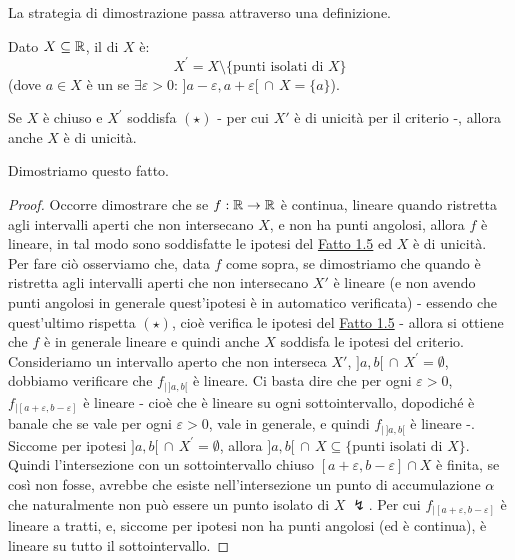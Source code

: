 La strategia di dimostrazione passa attraverso una definizione.

\begin{definition}
Dato $X \subseteq \mathbb R$, il  di $X$ è:
\[ X^{\prime} = X \setminus\{\text{punti isolati di $X$}\}
	\]
(dove $a \in X$ è un  se $\exists \varepsilon > 0 :\, ]a - \varepsilon, a + \varepsilon[ \,\cap\, X = \{a\}$).
\end{definition}

\begin{remark}
Se $X$ è chiuso e $X^{\prime}$ soddisfa $(\star)$ - per cui $X'$ è di unicità per il criterio -, allora anche $X$ è di unicità.
\end{remark}

Dimostriamo questo fatto.

\begin{proof}
Occorre dimostrare che se $f : \mathbb R \to \mathbb R$ è continua, lineare quando ristretta agli intervalli aperti che non intersecano $X$, e non ha punti angolosi, allora $f$ è lineare, in tal modo sono soddisfatte le ipotesi del \hyperref[unicità]{Fatto 1.5} ed $X$ è di unicità.\\
Per fare ciò osserviamo che, data $f$ come sopra, se dimostriamo che quando è ristretta agli intervalli aperti che non intersecano $X'$ è lineare (e non avendo punti angolosi in generale quest'ipotesi è in automatico verificata) - essendo che quest'ultimo rispetta $(\star)$, cioè verifica le ipotesi del \hyperref[unicità]{Fatto 1.5} - allora si ottiene che $f$ è in generale lineare e quindi anche $X$ soddisfa le ipotesi del criterio.\\
Consideriamo un intervallo aperto che non interseca $X'$, $]a,b[ \,\cap\, X^{\prime} = \emptyset$, dobbiamo verificare che $f_{|\,]a,b[}$ è lineare. Ci basta dire che per ogni $\varepsilon > 0$, $f_{|[a+\varepsilon, b-\varepsilon]}$ è lineare - cioè che è lineare su ogni sottointervallo, dopodiché è banale che se vale per ogni $\varepsilon > 0$, vale in generale, e quindi $f_{|\,]a,b[}$ è lineare -.\\
Siccome per ipotesi $]a,b[ \, \cap \, X^{\prime} = \emptyset$, allora $]a,b[ \,\cap\, X \subseteq \{\text{punti isolati di $X$}\}$. Quindi l'intersezione con un sottointervallo chiuso $[a+\varepsilon, b-\varepsilon] \cap X$ è finita, se così non fosse, avrebbe che esiste nell'intersezione un punto di accumulazione 
$\alpha$ che naturalmente non può essere un punto isolato di $X\;\lightning$. Per cui $f_{|[a+\varepsilon, b-\varepsilon]}$ è lineare a tratti, e, siccome per ipotesi non ha punti angolosi (ed è continua), è lineare su tutto il sottointervallo.
\end{proof}

